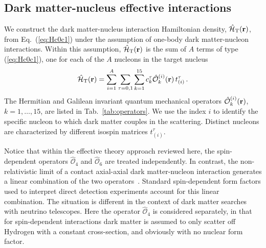 \documentclass[11pt,a4paper]{article}
\begin{document}
\subsection{Dark matter-nucleus effective interactions}
We construct the dark matter-nucleus interaction Hamiltonian density, $\hat{\mathcal{H}}_{\rm T}({\bf{r}})$, from Eq.~(\ref{eq:Hc0c1}) under the assumption of one-body dark matter-nucleon interactions. Within this assumption, 
$\hat{\mathcal{H}}_{\rm T}({\bf{r}})$ is the sum of $A$ terms of type (\ref{eq:Hc0c1}), one for each of the $A$ nucleons in the target nucleus
\begin{equation}
\hat{\mathcal{H}}_{\rm T}({\bf{r}}) = \sum_{i=1}^{A}  \sum_{\tau=0,1} \sum_{k=1}^{15} c_k^{\tau}\hat{\mathcal{O}}_{k}^{(i)}({\bf{r}}) \, t^{\tau}_{(i)} \,.
\label{eq:H_I}
\end{equation}
The Hermitian and Galilean invariant quantum mechanical operators $\hat{\mathcal{O}}_{k}^{(i)}({\bf{r}})$, $k=1,\dots,15$, are listed in Tab.~\ref{tab:operators}. We use the index $i$ to identify the specific nucleon to which dark matter couples in the scattering. Distinct nucleons are characterized by different isospin matrices $t^{\tau}_{(i)}$. 

Notice that within the effective theory approach reviewed here, the spin-dependent operators $\hat{\mathcal{O}}_{4}$ and $\hat{\mathcal{O}}_{6}$ are treated independently. In contrast, the non-relativistic limit of a contact axial-axial dark matter-nucleon interaction generates a linear combination of the two operators~\cite{Engel:1992}. Standard spin-dependent form factors used to interpret direct detection experiments account for this linear combination. The situation is different in the context of dark matter searches with neutrino telescopes. Here the operator $\hat{\mathcal{O}}_{4}$ is considered separately, in that for spin-dependent interactions dark matter is assumed to only scatter off Hydrogen with a constant cross-section, and obviously with no nuclear form factor.
\end{document}
